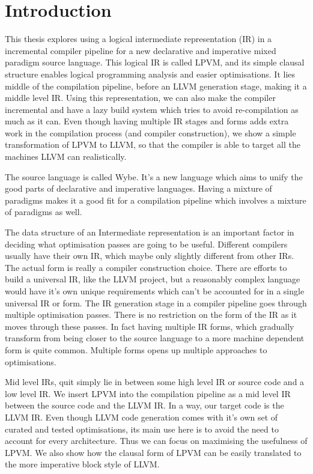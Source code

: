 \chapter{Introduction}


This thesis explores using a logical intermediate representation (IR) in a
incremental compiler pipeline for a new declarative and imperative mixed
paradigm source language. This logical IR is called LPVM, and its simple
clausal structure enables logical programming analysis and easier
optimisations. It lies middle of the compilation pipeline, before an LLVM
generation stage, making it a middle level IR. Using this representation, we
can also make the compiler incremental and have a lazy build system which tries
to avoid re-compilation as much as it can. Even though having multiple IR
stages and forms adds extra work in the compilation process (and compiler
construction), we show a simple transformation of LPVM to LLVM, so that the
compiler is able to target all the machines LLVM can realistically.

The source language is called Wybe. It's a new language which aims to unify
the good parts of declarative and imperative languages. Having a mixture of
paradigms makes it a good fit for a compilation pipeline which involves a
mixture of paradigms as well. 

The data structure of an Intermediate representation is an important factor in
deciding what optimisation passes are going to be useful. Different compilers
usually have their own IR, which maybe only slightly different from other
IRs. The actual form is really a compiler construction choice. There are
efforts to build a universal IR, like the LLVM project, but a reasonably
complex language would have it's own unique requirements which can't be
accounted for in a single universal IR or form. The IR generation stage in a
compiler pipeline goes through multiple optimisation passes. There is no
restriction on the form of the IR as it moves through these passes. In fact
having multiple IR forms, which gradually transform from being closer to the
source language to a more machine dependent form is quite common. Multiple
forms opens up multiple approaches to optimisations. 

Mid level IRs, quit simply lie in between some high level IR or source code and
a low level IR. We insert LPVM into the compilation pipeline as a mid level
IR between the source code and the LLVM IR. In a way, our target code is the
LLVM IR. Even though LLVM code generation comes with it's own set of curated
and tested optimisations, its main use here is to avoid the need to account for
every architecture. Thus we can focus on maximising the usefulness of
LPVM. We also show how the clausal form of LPVM can be easily translated to the
more imperative block style of LLVM.

